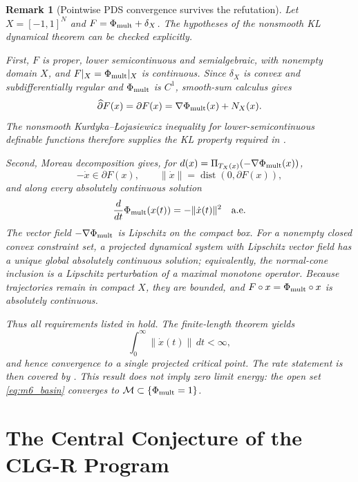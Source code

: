 \documentclass[11pt,a4paper]{article}
\newtheorem{remark}[theorem]{Remark}
\begin{document}
\begin{remark}[Pointwise PDS convergence survives the refutation]
Let $X=[-1,1]^N$ and $F=\Phi_{\rm mult}+\delta_X$. The hypotheses of the nonsmooth KL dynamical theorem can be checked explicitly.

First, $F$ is proper, lower semicontinuous and semialgebraic, with nonempty domain $X$, and $F|_X=\Phi_{\rm mult}|_X$ is continuous. Since $\delta_X$ is convex and subdifferentially regular and $\Phi_{\rm mult}$ is $C^1$, smooth-sum calculus gives
\[
\widehat\partial F(x)=\partial F(x)=\nabla\Phi_{\rm mult}(x)+N_X(x).
\]
The nonsmooth Kurdyka--\L{}ojasiewicz inequality for lower-semicontinuous definable functions \cite[Theorem~11]{bolte2007clarke} therefore supplies the KL property required in \cite[Remark~4.8]{bolte2007lojasiewicz}.

Second, Moreau decomposition gives, for $d(x)=\Pi_{T_X(x)}(-\nabla\Phi_{\rm mult}(x))$,
\[
-\dot x\in\partial F(x),
\qquad
\|\dot x\|=\operatorname{dist}(0,\partial F(x)),
\]
and along every absolutely continuous solution
\[
\frac{d}{dt}\Phi_{\rm mult}(x(t))=-\|\dot x(t)\|^2
\quad\text{a.e.}
\]
The vector field $-\nabla\Phi_{\rm mult}$ is Lipschitz on the compact box. For a nonempty closed convex constraint set, a projected dynamical system with Lipschitz vector field has a unique global absolutely continuous solution; equivalently, the normal-cone inclusion is a Lipschitz perturbation of a maximal monotone operator. Because trajectories remain in compact $X$, they are bounded, and $F\circ x=\Phi_{\rm mult}\circ x$ is absolutely continuous.

Thus all requirements listed in \cite[Remark~4.8]{bolte2007lojasiewicz} hold. The finite-length theorem \cite[Theorem~4.5]{bolte2007lojasiewicz} yields
\[
\int_0^\infty\|\dot x(t)\|\,dt<\infty,
\]
and hence convergence to a single projected critical point. The rate statement is then covered by \cite[Theorem~4.7]{bolte2007lojasiewicz}. This result does not imply zero limit energy: the open set \eqref{eq:m6_basin} converges to $\mathcal M\subset\{\Phi_{\rm mult}=1\}$.
\end{remark}

\section{The Central Conjecture of the CLG-R Program}
\end{document}
